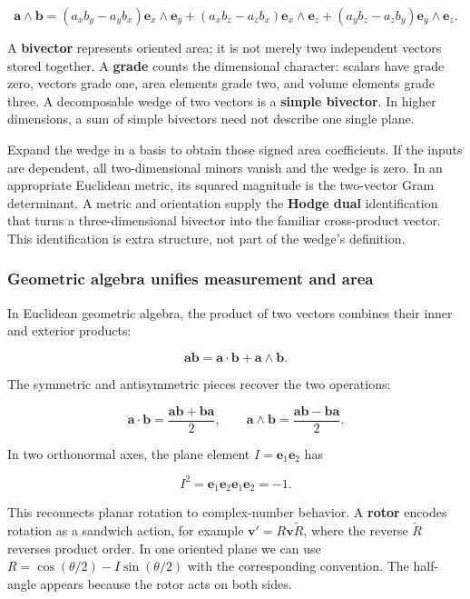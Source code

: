 \[
\mathbf a\wedge\mathbf b
=(a_xb_y-a_yb_x)\mathbf e_x\wedge\mathbf e_y
+(a_xb_z-a_zb_x)\mathbf e_x\wedge\mathbf e_z
+(a_yb_z-a_zb_y)\mathbf e_y\wedge\mathbf e_z.
\]

A \textbf{bivector} represents oriented area; it is not merely two independent vectors stored together. A \textbf{grade} counts the dimensional character: scalars have grade zero, vectors grade one, area elements grade two, and volume elements grade three. A decomposable wedge of two vectors is a \textbf{simple bivector}. In higher dimensions, a sum of simple bivectors need not describe one single plane.

Expand the wedge in a basis to obtain those signed area coefficients. If the inputs are dependent, all two-dimensional minors vanish and the wedge is zero. In an appropriate Euclidean metric, its squared magnitude is the two-vector Gram determinant. A metric and orientation supply the \textbf{Hodge dual} identification that turns a three-dimensional bivector into the familiar cross-product vector. This identification is extra structure, not part of the wedge's definition.

\subsubsection{Geometric algebra unifies measurement and area}\label{01-foundations-i-ch018-geometric-algebra-unifies-measurement-and-area}

In Euclidean geometric algebra, the product of two vectors combines their inner and exterior products:

\[
\mathbf a\mathbf b=\mathbf a\cdot\mathbf b+\mathbf a\wedge\mathbf b.
\]

The symmetric and antisymmetric pieces recover the two operations:

\[
\mathbf a\cdot\mathbf b=\frac{\mathbf a\mathbf b+\mathbf b\mathbf a}{2},\qquad
\mathbf a\wedge\mathbf b=\frac{\mathbf a\mathbf b-\mathbf b\mathbf a}{2}.
\]

In two orthonormal axes, the plane element \(I=\mathbf e_1\mathbf e_2\) has

\[
I^2=\mathbf e_1\mathbf e_2\mathbf e_1\mathbf e_2=-1.
\]

This reconnects planar rotation to complex-number behavior. A \textbf{rotor} encodes rotation as a sandwich action, for example \(\mathbf v'=R\mathbf v\widetilde R\), where the reverse \(\widetilde R\) reverses product order. In one oriented plane we can use \(R=\cos(\theta/2)-I\sin(\theta/2)\) with the corresponding convention. The half-angle appears because the rotor acts on both sides.


